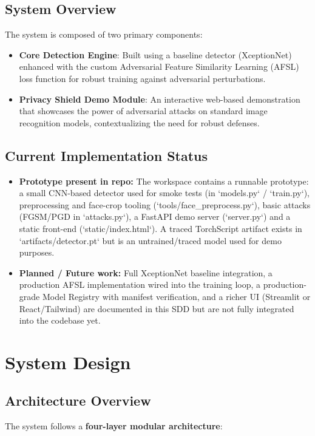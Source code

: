 \documentclass[a4paper,12pt]{article}
\begin{document}
\subsection{System Overview}
The system is composed of two primary components:
\begin{itemize}
    \item \textbf{Core Detection Engine}: Built using a baseline detector (XceptionNet) enhanced with the custom Adversarial Feature Similarity Learning (AFSL) loss function for robust training against adversarial perturbations.
    \item \textbf{Privacy Shield Demo Module}: An interactive web-based demonstration that showcases the power of adversarial attacks on standard image recognition models, contextualizing the need for robust defenses.
\end{itemize}

\subsection{Current Implementation Status}
\begin{itemize}
    \item \textbf{Prototype present in repo:} The workspace contains a runnable prototype: a small CNN-based detector used for smoke tests (in `models.py` / `train.py`), preprocessing and face-crop tooling (`tools/face_preprocess.py`), basic attacks (FGSM/PGD in `attacks.py`), a FastAPI demo server (`server.py`) and a static front-end (`static/index.html`). A traced TorchScript artifact exists in `artifacts/detector.pt` but is an untrained/traced model used for demo purposes.
    \item \textbf{Planned / Future work:} Full XceptionNet baseline integration, a production AFSL implementation wired into the training loop, a production-grade Model Registry with manifest verification, and a richer UI (Streamlit or React/Tailwind) are documented in this SDD but are not fully integrated into the codebase yet.
\end{itemize}

\section{System Design}

\subsection{Architecture Overview}
The system follows a \textbf{four-layer modular architecture}:
\end{document}
